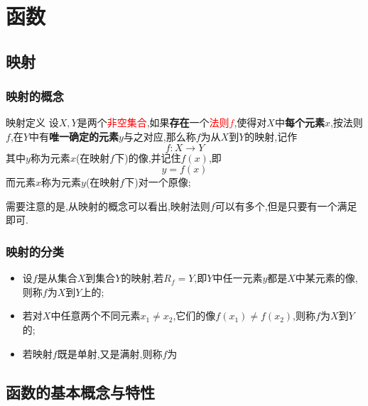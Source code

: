 \documentclass[12pt, a4paper, oneside, UTF8]{ctexbook}  %
\begin{document}
% 
\else
\fi
\chapter{函数}
\section{映射}
\subsection{映射的概念}
\begin{defn}{映射定义}{}
    设$X,Y$是两个\textcolor{red}{非空集合},如果\textbf{存在}一个\textcolor{red}{法则$f$},使得对$X$中\textbf{每个元素}$x$,按法则$f$,在$Y$中有\textbf{唯一确定的元素}$y$与之对应,那么称$f$为从$X$到$Y$的映射,记作
    $$
        f:X \to Y
    $$
    其中$y$称为元素$x$(在映射$f$下)的像,并记住$f(x)$,即
    $$
        y=f(x)
    $$
    而元素$x$称为元素$y$(在映射$f$下)对一个原像;
\end{defn}
需要注意的是,从映射的概念可以看出,映射法则$f$可以有多个,但是只要有一个满足即可.
\subsection{映射的分类}
\begin{itemize}
    \item 设$f$是从集合$X$到集合$Y$的映射,若$R_f=Y$,即$Y$中任一元素$y$都是$X$中某元素的像,则称$f$为$X$到$Y$上的;
    \item 若对$X$中任意两个不同元素$x_1 \neq x_2$,它们的像$f(x_1) \neq f(x_2)$,则称$f$为$X$到$Y$的;
    \item 若映射$f$既是单射,又是满射,则称$f$为
\end{itemize}
\section{函数的基本概念与特性}
\end{document}

